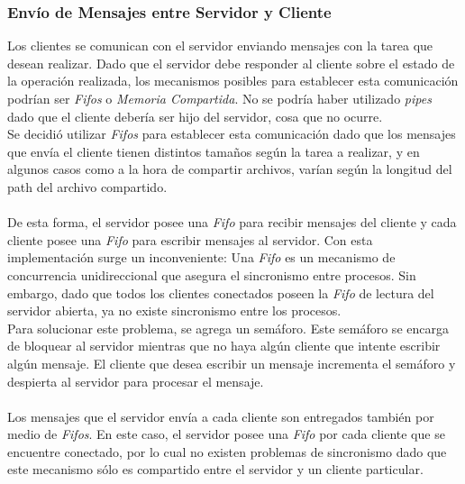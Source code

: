 \documentclass[a4paper,10pt]{article}
\begin{document}
		\subsubsection{Env\'io de Mensajes entre Servidor y Cliente}
			Los clientes se comunican con el servidor enviando mensajes con la tarea que desean realizar. Dado que el servidor 
			debe responder al cliente sobre el estado de la operaci\'on realizada, los mecanismos posibles para establecer esta 
			comunicaci\'on podr\'ian ser \emph{Fifos} o \emph{Memoria Compartida}. No se podr\'ia haber utilizado \emph{pipes} dado 
			que el cliente deber\'ia ser hijo del servidor, cosa que no ocurre. \\
			\indent Se decidi\'o utilizar \emph{Fifos} para establecer esta comunicaci\'on dado que los mensajes que env\'ia el cliente
			tienen distintos tama\~nos seg\'un la tarea a realizar, y en algunos casos como a la hora de compartir archivos, var\'ian 
			seg\'un la longitud del path del archivo compartido. \\ \\
			\indent De esta forma, el servidor posee una \emph{Fifo} para recibir mensajes del cliente y cada cliente posee una \emph{Fifo}
			para escribir mensajes al servidor. Con esta implementaci\'on surge un inconveniente: Una \emph{Fifo} es un mecanismo de 
			concurrencia unidireccional que asegura el sincronismo entre procesos. Sin embargo, dado que todos los clientes conectados poseen
			la \emph{Fifo} de lectura del servidor abierta, ya no existe sincronismo entre los procesos.  \\
			\indent Para solucionar este problema, se agrega un sem\'aforo. Este sem\'aforo se encarga de bloquear al servidor mientras que no 
			haya alg\'un cliente que intente escribir alg\'un mensaje. El cliente que desea escribir un mensaje incrementa el sem\'aforo y 
			despierta al servidor para procesar el mensaje. \\ \\
			\indent Los mensajes que el servidor env\'ia a cada cliente son entregados tambi\'en por medio de \emph{Fifos}. En este caso, el 
			servidor posee una \emph{Fifo} por cada cliente que se encuentre conectado, por lo cual no existen problemas de sincronismo dado que
			este mecanismo s\'olo es compartido entre el servidor y un cliente particular.
\end{document}
